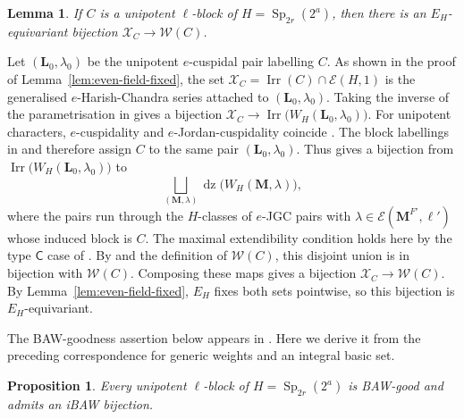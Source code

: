 \documentclass[10pt]{amsart}
\newtheorem{proposition}[theorem]{Proposition}
\newtheorem{lemma}[theorem]{Lemma}
\theoremstyle{definition}
\let\oldendproof\endproof
\renewenvironment{proof}[1][\proofname]{%
  \oldproof[\bfseries #1]%
}{\oldendproof}
\DeclareMathOperator{\Irr}{Irr}
\DeclareMathOperator{\dz}{dz}
\DeclareMathOperator{\Sp}{Sp}
\numberwithin{equation}{section}
\numberwithin{table}{section}
\begin{document}
\begin{lemma}\label{lem:even-unipotent-correspondence}
If $C$ is a unipotent $\ell$-block of $H=\Sp_{2r}(2^a)$, then there is an
$E_H$-equivariant bijection $\mathcal X_C\longrightarrow\mathcal W(C)$.
\end{lemma}

\begin{proof}
Let $(\mathbf L_0,\lambda_0)$ be the unipotent $e$-cuspidal pair
labelling $C$.  As shown in the proof of
Lemma~\ref{lem:even-field-fixed}, the set
$\mathcal X_C=\Irr(C)\cap\mathcal E(H,1)$ is the generalised
$e$-Harish-Chandra series attached to $(\mathbf L_0,\lambda_0)$.
Taking the inverse of the parametrisation in
\cite[Theorem~2.8]{CabanesSpath2013} gives a bijection
$\mathcal X_C\longrightarrow\Irr\bigl(W_H(\mathbf L_0,\lambda_0)\bigr)$.
For unipotent characters, $e$-cuspidality and $e$-Jordan-cuspidality coincide
\cite[Definition~2.1 and Remark~2.2]{KessarMalle2015}.
The block labellings in \cite[Theorem~4.4(i)]{CabanesEnguehard1994} and
\cite[Theorem~A(e)]{KessarMalle2015} therefore assign $C$ to the same pair
$(\mathbf L_0,\lambda_0)$.  Thus
\cite[Theorem~7.5]{FengMalleZhang2026} gives a bijection from
$\Irr\bigl(W_H(\mathbf L_0,\lambda_0)\bigr)$ to
\[
 \bigsqcup_{(\mathbf M,\lambda)}
 \dz\bigl(W_H(\mathbf M,\lambda)\bigr),
\]
where the pairs run through the $H$-classes of $e$-JGC pairs
with $\lambda\in\mathcal E(\mathbf M^{F'},\ell')$
whose induced block is $C$.  The maximal extendibility condition holds
here by the type $\mathsf C$ case of
\cite[Proposition~3.20]{FengMalleZhang2026}.  By
\cite[Lemma~3.21]{FengMalleZhang2026} and the definition of
$\mathcal W(C)$, this disjoint union is in bijection with $\mathcal W(C)$.
Composing these maps gives a bijection
$\mathcal X_C\longrightarrow\mathcal W(C)$.  By
Lemma~\ref{lem:even-field-fixed}, $E_H$ fixes both sets pointwise, so this
bijection is $E_H$-equivariant.
\end{proof}

The BAW-goodness assertion below appears in
\cite[Remark~5.9]{FengLiZhang2022Jordan}. Here we derive it from
the preceding correspondence for generic weights and an integral basic set.

\begin{proposition}\label{prop:even-unipotent}
Every unipotent $\ell$-block of $H=\Sp_{2r}(2^a)$ is BAW-good and
admits an iBAW bijection.
\end{proposition}
\end{document}
